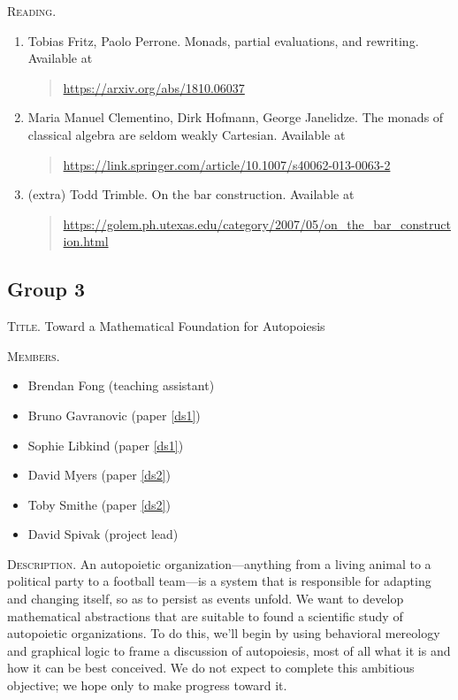 \documentclass[11pt, oneside]{article}
\begin{document}
\textsc{Reading.}
\begin{enumerate}
\item \label{tf1}
  Tobias Fritz, Paolo Perrone. Monads, partial evaluations,
  and rewriting. Available at
  \begin{quote}
    \href{https://arxiv.org/abs/1810.06037}{https://arxiv.org/abs/1810.06037}
  \end{quote}
\item \label{tf2}
  Maria Manuel Clementino, Dirk Hofmann, George
  Janelidze. The monads of classical algebra are seldom
  weakly Cartesian. Available at
  \begin{quote}
 \href{https://link.springer.com/article/10.1007/s40062-013-0063-2}{https://link.springer.com/article/10.1007/s40062-013-0063-2}
  \end{quote}
\item (extra)
  Todd Trimble. On the bar construction. Available at
  \begin{quote} \href{https://golem.ph.utexas.edu/category/2007/05/on\_the\_bar\_construction.html}{https://golem.ph.utexas.edu/category/2007/05/on\_the\_bar\_construction.html}
  \end{quote}
\end{enumerate}

\pagebreak

%
%

\subsection*{Group 3}

\textsc{Title.}  Toward a Mathematical Foundation
for Autopoiesis

\textsc{Members.}
\begin{multicols}{2}
  \begin{itemize}
  \item Brendan Fong (teaching assistant)
  \item Bruno Gavranovic (paper \ref{ds1})
  \item Sophie Libkind (paper \ref{ds1})
  \item David Myers (paper \ref{ds2})
  \item Toby Smithe (paper \ref{ds2})
  \item David Spivak (project lead)
  \end{itemize}
\end{multicols}

\textsc{Description.}  An autopoietic organization---anything
from a living animal to a political party to a football
team---is a system that is responsible for adapting and
changing itself, so as to persist as events unfold. We want
to develop mathematical abstractions that are suitable to
found a scientific study of autopoietic organizations. To do
this, we'll begin by using behavioral mereology and
graphical logic to frame a discussion of autopoiesis, most
of all what it is and how it can be best conceived. We do
not expect to complete this ambitious objective; we hope
only to make progress toward it.
\end{document}

